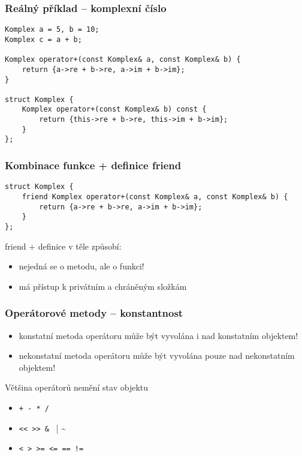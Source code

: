 \begin{frame}[fragile]
\frametitle{Reálný příklad -- komplexní číslo}
\begin{yesblock} 
\begin{lstlisting}
Komplex a = 5, b = 10;
Komplex c = a + b;

Komplex operator+(const Komplex& a, const Komplex& b) {
	return {a->re + b->re, a->im + b->im};
}

struct Komplex {
	Komplex operator+(const Komplex& b) const {
		return {this->re + b->re, this->im + b->im};
	}
};
\end{lstlisting}
\end{yesblock}
\end{frame}




\begin{frame}[fragile]
\frametitle{Kombinace funkce + definice friend}
\begin{yesblock} 
\begin{lstlisting}[basicstyle=\small]
struct Komplex {
	friend Komplex operator+(const Komplex& a, const Komplex& b) {
		return {a->re + b->re, a->im + b->im};
	}
};
\end{lstlisting}
\end{yesblock}
\begin{block}{}
friend + definice v těle způsobí:
\begin{itemize}
\item nejedná se o metodu, ale o funkci!
\item má přístup k privátním a chráněným složkám
\end{itemize}
\end{block}
\end{frame}







\begin{frame}[fragile]
\frametitle{Operátorové metody -- konstantnost}
\begin{block}{}
\begin{itemize}
\item konstatní metoda operátoru může být vyvolána i nad konstatním objektem!
\item nekonstatní metoda operátoru může být vyvolána pouze nad nekonstatním objektem!
\end{itemize}
\end{block}

\begin{block}{}
Většina operátorů nemění stav objektu
\begin{itemize}
\item \lstinline|+ - * / |
\item \lstinline|<< >> & | | \~{}
\item \lstinline|< > >= <= == !=|
\end{itemize}
\end{block}
\end{frame}











